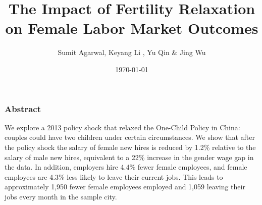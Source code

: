 \documentclass{beamer}
\title[文献分享:ZY]{The Impact of Fertility Relaxation on Female Labor Market Outcomes}
\author[Sumit et al.]{Sumit Agarwal, Keyang Li , Yu Qin \& Jing Wu}
\date{\today}
\begin{document}
\frame{\titlepage}



\begin{frame}
\frametitle{Abstract}
We explore a 2013 policy shock that relaxed the One-Child Policy in China: couples could have two children under certain circumstances. We show that after the policy shock the salary of female new hires is reduced by 1.2\% relative to the salary of male new hires, equivalent to a 22\% increase in the gender wage gap in the data. In addition, employers hire 4.4\% fewer female employees, and female employees are 4.3\% less likely to leave their current jobs. This leads to approximately 1,950 fewer female employees employed and 1,059 leaving their jobs every month in the sample city.
\end{frame}

\begin{frame}
	\frametitle{}
	
\end{frame}


\begin{frame}
	\frametitle{}
	
\end{frame}

\begin{frame}
	\frametitle{}
	
\end{frame}


\begin{frame}
	\frametitle{}
	
\end{frame}


\begin{frame}
	\frametitle{}
	
\end{frame}


\begin{frame}
	\frametitle{}
	
\end{frame}
\end{document}
